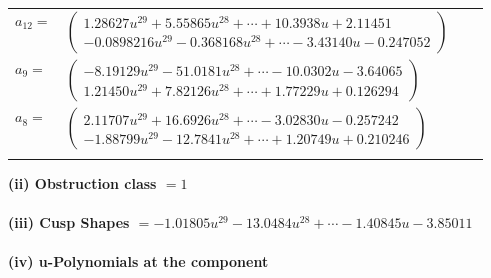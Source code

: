 \documentclass[1p]{elsarticle_modified}
\theoremstyle{definition}
\begin{document}
\begin{tabular}{m{7pt} m{180pt} m{7pt} m{180pt} }
\flushright $a_{12}=$&$\begin{pmatrix}1.28627 u^{29}+5.55865 u^{28}+\cdots+10.3938 u+2.11451\\-0.0898216 u^{29}-0.368168 u^{28}+\cdots-3.43140 u-0.247052\end{pmatrix}$ \\
\flushright $a_{9}=$&$\begin{pmatrix}-8.19129 u^{29}-51.0181 u^{28}+\cdots-10.0302 u-3.64065\\1.21450 u^{29}+7.82126 u^{28}+\cdots+1.77229 u+0.126294\end{pmatrix}$ \\
\flushright $a_{8}=$&$\begin{pmatrix}2.11707 u^{29}+16.6926 u^{28}+\cdots-3.02830 u-0.257242\\-1.88799 u^{29}-12.7841 u^{28}+\cdots+1.20749 u+0.210246\end{pmatrix}$\\&\end{tabular}
\flushleft \textbf{(ii) Obstruction class $= 1$}\\~\\
\flushleft \textbf{(iii) Cusp Shapes $= -1.01805 u^{29}-13.0484 u^{28}+\cdots-1.40845 u-3.85011$}\\~\\
\newpage\renewcommand{\arraystretch}{1}
\flushleft \textbf{(iv) u-Polynomials at the component}\newline \\
\end{document}
